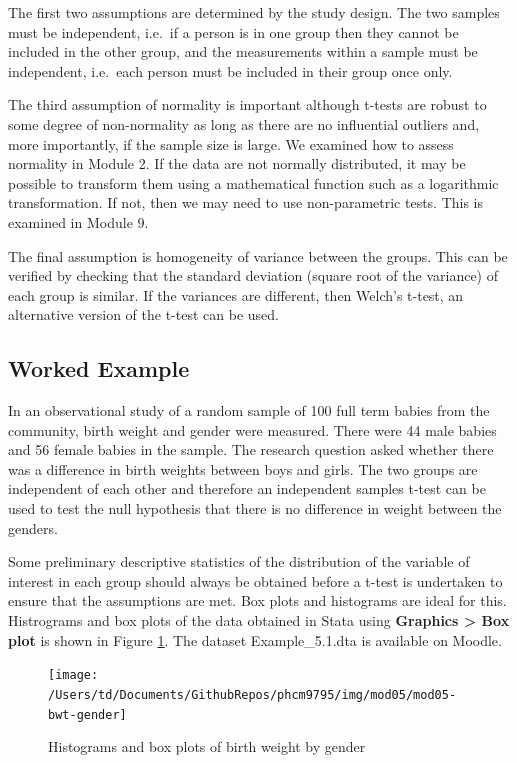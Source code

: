 \documentclass[
]{memoir}
\begin{document}
The first two assumptions are determined by the study design. The two samples must be independent, i.e.~if a person is in one group then they cannot be included in the other group, and the measurements within a sample must be independent, i.e.~each person must be included in their group once only.

The third assumption of normality is important although t-tests are robust to some degree of non-normality as long as there are no influential outliers and, more importantly, if the sample size is large. We examined how to assess normality in Module 2. If the data are not normally distributed, it may be possible to transform them using a mathematical function such as a logarithmic transformation. If not, then we may need to use non-parametric tests. This is examined in Module 9.

The final assumption is homogeneity of variance between the groups. This can be verified by checking that the standard deviation (square root of the variance) of each group is similar. If the variances are different, then Welch's t-test, an alternative version of the t-test can be used.

\hypertarget{worked-example-5}{%
\subsection{Worked Example}\label{worked-example-5}}

In an observational study of a random sample of 100 full term babies from the community, birth weight and gender were measured. There were 44 male babies and 56 female babies in the sample. The research question asked whether there was a difference in birth weights between boys and girls. The two groups are independent of each other and therefore an independent samples t-test can be used to test the null hypothesis that there is no difference in weight between the genders.

Some preliminary descriptive statistics of the distribution of the variable of interest in each group should always be obtained before a t-test is undertaken to ensure that the assumptions are met. Box plots and histograms are ideal for this. Histrograms and box plots of the data obtained in Stata using \textbf{Graphics \textgreater{} Box plot} is shown in Figure \ref{fig:mod05-bwt-gender}. The dataset Example\_5.1.dta is available on Moodle.

\begin{figure}
\texttt{[image: /Users/td/Documents/GithubRepos/phcm9795/img/mod05/mod05-bwt-gender]} \caption{Histograms and box plots of birth weight by gender}\label{fig:mod05-bwt-gender}
\end{figure}
\end{document}

